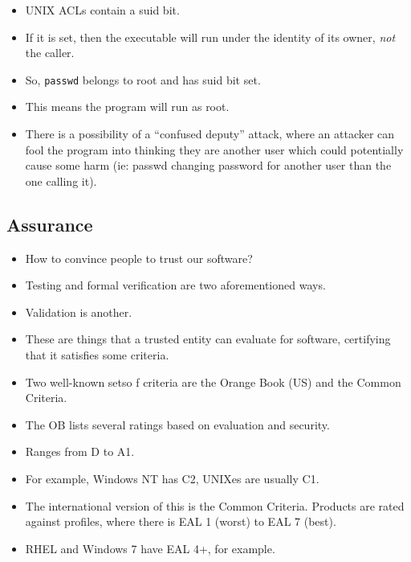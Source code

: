 \documentclass{article}
\begin{document}
\begin{itemize}
        \begin{itemize}
            \item UNIX ACLs contain a suid bit.
            \item If it is set, then the executable will run under the identity of its owner, \emph{not} the caller.
            \item So, \lstinline{passwd} belongs to root and has suid bit set.
            \item This means the program will run as root.
            \item There is a possibility of a ``confused deputy'' attack, where an attacker can fool the program into thinking they are another user which could potentially cause some harm (ie: passwd changing password for another user than the one calling it).
        \end{itemize}
\end{itemize}

\subsection{Assurance}
\begin{itemize}
    \item How to convince people to trust our software?
    \item Testing and formal verification are two aforementioned ways.
    \item Validation is another.
    \item These are things that a trusted entity can evaluate for software, certifying that it satisfies some criteria.
    \item Two well-known setso f criteria are the Orange Book (US) and the Common Criteria.
    \item The OB lists several ratings based on evaluation and security.
    \item Ranges from D to A1.
    \item For example, Windows NT has C2, UNIXes are usually C1.
    \item The international version of this is the Common Criteria.  Products are rated against profiles, where there is EAL 1 (worst) to EAL 7 (best).
    \item RHEL and Windows 7 have EAL 4+, for example.
\end{itemize}
\end{document}
